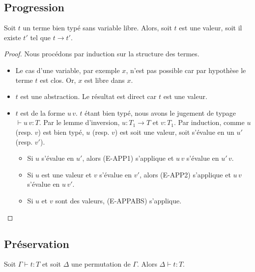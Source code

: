 \subsection*{Progression}

\begin{theorem} 
  \label{thm:simply-typed-lambda-calculus-progression}
  Soit $t$ un terme bien typé sans variable libre. Alors, soit $t$ est une
  valeur, soit il existe $t'$ tel que $t \rightarrow t'$.
\end{theorem}

\begin{proof}
  \label{proof:simply-typed-lambda-calculus-progression}
  Nous procédons par induction sur la structure des termes.
  \begin{itemize}
    \item Le cas d'une variable, par exemple $x$, n'est pas possible car par
      hypothèse le terme $t$ est clos. Or, $x$ est libre dans $x$.
    \item $t$ est une abstraction. Le résultat est direct car $t$ est une valeur.
    \item $t$ est de la forme $u \, v$. $t$ étant
      bien typé, nous avons le jugement de typage $\vdash u \, v : T$. Par le lemme
      d'inversion, $u : T_{1} \rightarrow T$ et $v : T_{1}$. Par induction,
      comme $u$ (resp. $v$) est bien typé, $u$ (resp. $v$) est soit une valeur,
      soit s'évalue en un $u'$ (resp. $v'$).
      \begin{itemize}
        \item Si $u$ s'évalue en $u'$, alors (E-APP1) s'applique et $u \, v$
          s'évalue en $u' \, v$.
        \item Si $u$ est une valeur et $v$ s'évalue en $v'$, alors (E-APP2)
          s'applique et $u \, v$ s'évalue en $u \, v'$.
        \item Si $u$ et $v$ sont des valeurs, (E-APPABS) s'applique.
      \end{itemize}
  \end{itemize}
\end{proof}

\subsection*{Préservation}

\begin{lemma} [de permutation]
  \label{thm:simply-typed-lambda-calculus-permutation}
  Soit $\Gamma \vdash t : T$ et soit $\Delta$ une permutation de $\Gamma$. Alors
  $\Delta \vdash t : T$.
\end{lemma}

